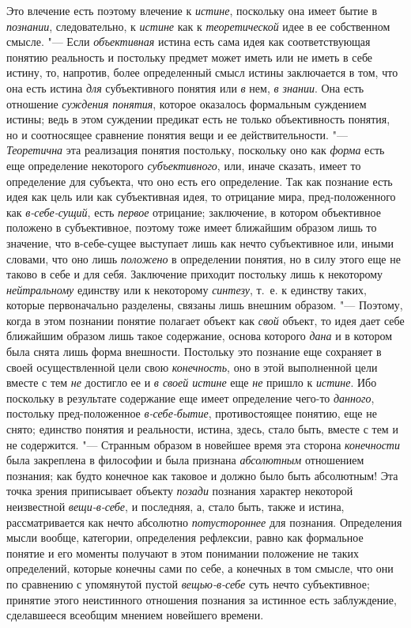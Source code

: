 Это влечение есть поэтому влечение к {\em истине}, поскольку
она имеет бытие в {\em познании}, следовательно, к {\em истине} как к
{\em теоретической} идее в ее собственном смысле. "--- Если
{\em объективная} истина
есть сама идея как соответствующая понятию реальность и постольку предмет
может иметь или не иметь в себе истину, то, напротив, более определенный
смысл истины заключается в том, что она есть истина
{\em для} субъективного понятия или {\em в} нем, {\em в знании}. Она есть
отношение {\em суждения понятия},
которое оказалось формальным суждением истины; ведь в этом
суждении предикат есть не только объективность понятия, но и соотносящее
сравнение понятия вещи и ее действительности. "---
{\em Теоретична} эта реализация понятия постольку, поскольку оно как
{\em форма} есть еще определение некоторого {\em субъективного}, или,
иначе сказать, имеет то определение для субъекта, что оно есть его
определение. Так как познание есть идея как цель или как субъективная идея,
то отрицание мира, пред-положенного как {\em в-себе-сущий}, есть
{\em первое} отрицание;
заключение, в котором объективное положено в субъективное, поэтому тоже
имеет ближайшим образом лишь то значение, что в-себе-сущее выступает лишь
как нечто субъективное или, иными словами, что оно лишь
{\em положено} в
определении понятия, но в силу этого еще не таково в себе и для себя.
Заключение приходит постольку лишь к некоторому
{\em нейтральному} единству или к некоторому {\em синтезу}, т.~е. к
единству таких, которые первоначально разделены, связаны лишь внешним
образом. "--- Поэтому, когда в этом познании понятие полагает
объект как {\em свой}
объект, то идея дает себе ближайшим образом лишь такое
содержание, основа которого {\em дана}
и в котором была снята лишь форма внешности. Постольку это
познание еще сохраняет в своей осуществленной цели свою
{\em конечность}, оно в этой выполненной цели вместе с тем
{\em не} достигло ее и {\em в своей истине} еще
{\em не} пришло к {\em истине}. Ибо
поскольку в результате содержание еще имеет определение чего-то
{\em данного}, постольку
пред-положенное {\em в-себе-бытие},
противостоящее понятию, еще не снято; единство понятия и
реальности, истина, здесь, стало быть, вместе с тем и не содержится. "---
Странным образом в новейшее время эта сторона {\em конечности} была
закреплена в философии и была признана {\em абсолютным} отношением
познания;
как будто конечное как таковое и должно было быть абсолютным!
Эта точка зрения приписывает объекту {\em позади} познания
характер некоторой неизвестной {\em вещи-в-себе}, и
последняя, а, стало быть, также и истина, рассматривается
как нечто абсолютно {\em потустороннее}
для познания. Определения мысли вообще, категории,
определения рефлексии, равно как формальное понятие и его моменты получают
в этом понимании положение не таких определений, которые конечны сами по
себе, а конечных в том смысле, что они по сравнению с упомянутой пустой
{\em вещью-в-себе} суть
нечто субъективное; принятие этого неистинного отношения познания за
истинное есть заблуждение, сделавшееся всеобщим мнением новейшего времени.

